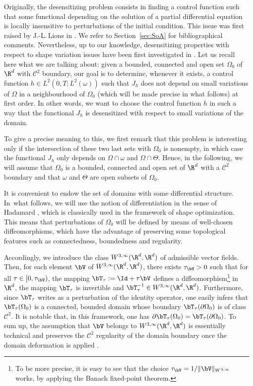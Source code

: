 Originally, the desensitizing problem consists in finding a control function such that some functional depending on the solution of a partial differential equation is locally {insensitive} to perturbations of the initial condition. This issue was first raised by J.\nobreakdash-L.\,Lions in \cite{Lions-1990}. We refer to Section~\ref{sec:SoA} for bibliographical comments. Nevertheless, up to our knowledge, desensitizing properties with respect to shape variation issues have been first investigated in \cite{Lissy-Privat-Simpore}. Let us recall here what we are talking about: given a bounded, connected and open set $\Omega_0$ of $\R^d$ with $\mathscr{C}^2$ boundary, our goal is to determine, whenever it exists, a control function $h \in L^2(0,T;L^2(\omega))$ such that $J_h$ does not depend on small variations of $\Omega$ in a neighbourhood of $\Omega_0$ (which will be made precise in what follows) at first order. In other words, we want to choose the control function $h$ in such a way that the functional $J_h$ is desensitized with respect to small variations of the domain.

To give a precise meaning to this, we first remark that this problem is interesting only if the intersection of these two last sets with $\Omega_0$ is nonempty, in which case the functional $J_h$ only depends on $\Omega\cap\omega$ and $\Omega\cap\Theta$. Hence, in the following, we will assume that $\Omega_0$ is a bounded, connected and open set of $\R^d$ with a $\mathscr{C}^2$ boundary and that $\omega$ and $\Theta$ are open subsets of $\Omega_{0}$.

It is convenient to endow the set of domains with some differential structure. In~what follows, we will use the notion of differentiation in the sense of Hadamard \cite{Delfour-Zolesio,Henrot-Pierre-2005}, which is classically used in the framework of shape optimization. This means that perturbations of $\Omega_0$ will be defined by means of well-chosen diffeomorphisms, which have the advantage of preserving some topological features such as connectedness, boundedness and regularity.

Accordingly, we introduce the class $W^{3, \infty}(\R^d, \R^d)$ of admissible vector fields. Then, for each element $\bV$ of $W^{3,\infty}(\R^d, \R^d)$, there exists $\tau_{\bV}>0$ such that for all $\tau\in [0,\tau_{\bV})$, the mapping $\bT_\tau:=\Id+\tau\bV$ defines a diffeomorphism\footnote{To be more precise, it is easy to see that the choice $\tau_{\bV}=1/\Vert \bV\Vert_{W^{3,\infty}}$ works, by applying the Banach fixed-point theorem.} in $\R^d$, \ie the mapping $\bT_\tau$ is invertible and $\bT_\tau^{-1}\in W^{3,\infty}(\R^d,\R^d)$.
Furthermore, since $\bT_\tau$ writes as a perturbation of the identity operator, one easily infers that $\bT_\tau(\Omega_0)$ is a connected, bounded domain whose boundary $\bT_\tau(\partial \Omega_0)$ is of class $\mathscr{C}^2$. It is notable that, in this framework, one has $\partial \bT_\tau(\Omega_0)=\bT_\tau(\partial \Omega_0)$. To sum up, the assumption that $\bV$ belongs to $W^{3,\infty}(\R^d, \R^d)$ is essentially technical and preserves the $\mathscr{C}^2$ regularity of the domain boundary once the domain deformation is applied \cite[Chap.\,7]{Delfour-Zolesio}.

